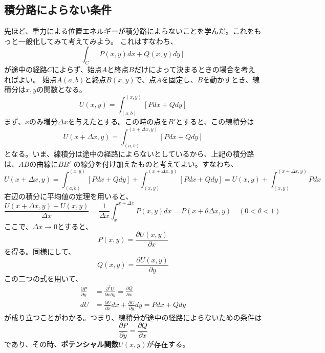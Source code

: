 \documentclass[a4j,dvipdfmx]{jsarticle}
\begin{document}
\subsection{積分路によらない条件}
先ほど、重力による位置エネルギーが積分路によらないことを学んだ。これをもっと一般化してみて考えてみよう。
これはすなわち、
\begin{equation*}
    \int_C[P(x,y)dx+Q(x,y)dy]
\end{equation*}
が途中の経路$C$によらず、始点$A$と終点$B$だけによって決まるときの場合を考えればよい。
始点$A(a,b)$と終点$B(x,y)$で、点$A$を固定し、$B$を動かすとき、線積分は$x,y$の関数となる。
\begin{equation*}
    U(x,y)=\int_{(a,b)}^{(x,y)}[Pdx+Qdy]
\end{equation*}
まず、$x$のみ増分$\Delta x$を与えたとする。この時の点を$B'$とすると、この線積分は
\begin{equation*}
    U(x+\Delta x,y)=\int_{(a,b)}^{(x+\Delta x,y)}[Pdx+Qdy]
\end{equation*}
となる。いま、線積分は途中の経路によらないとしているから、上記の積分路は、$AB$の曲線に$BB'$
の線分を付け加えたものと考えてよい。すなわち、
\begin{equation*}
    U(x+\Delta x,y)=\int_{(a,b)}^{(x,y)}[Pdx+Qdy]+\int_{(x,y)}^{(x+\Delta x,y)}[Pdx+Qdy]=U(x,y)+\int_{(x,y)}^{(x+\Delta x,y)}Pdx
\end{equation*}
右辺の積分に平均値の定理を用いると、
\begin{equation*}
    \frac{U(x+\Delta x,y)-U(x,y)}{\Delta x}=\frac{1}{\Delta x}\int_x^{x+\Delta x}P(x,y)dx=P(x+\theta\Delta x,y)\quad(0<\theta<1)
\end{equation*}
ここで、$\Delta x\to 0$とすると、
\begin{equation*}
    P(x,y)=\frac{\partial U(x,y)}{\partial x}
\end{equation*}
を得る。同様にして、
\begin{equation*}
    Q(x,y)=\frac{\partial U(x,y)}{\partial y}
\end{equation*}
この二つの式を用いて、
\begin{align*}
    \frac{\partial P}{\partial y}&=\frac{\partial^2 U}{\partial x\partial y}=\frac{\partial Q}{\partial x}\\
    dU&=\frac{\partial U}{\partial x}dx+\frac{\partial U}{\partial y}dy=Pdx+Qdy
\end{align*}
が成り立つことがわかる。つまり、線積分が途中の経路によらないための条件は
\begin{equation}
    \frac{\partial P}{\partial y}=\frac{\partial Q}{\partial x}\label{6.63}
\end{equation}
であり、その時、\textbf{ポテンシャル関数}$U(x,y)$が存在する。
\end{document}
